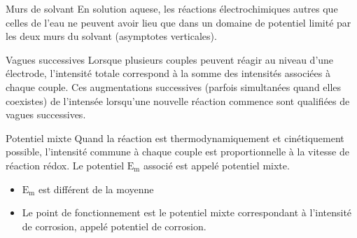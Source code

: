 \documentclass[french, a4paper, 11pt, twocolumn]{article}
\begin{document}
    \begin{cadre}{Murs de solvant}
        En solution aquese, les réactions électrochimiques autres que celles de l'eau ne peuvent avoir lieu que dans un
        domaine de potentiel limité par les deux murs du solvant (asymptotes verticales).
    \end{cadre}

    \begin{cadre}{Vagues successives}
        Lorsque plusieurs couples peuvent réagir au niveau d'une électrode, l'intensité totale correspond à la somme des 
        intensités associées à chaque couple. Ces augmentations successives (parfois simultanées quand elles coexistes)
        de l'intensée lorsqu'une nouvelle réaction commence sont qualifiées de vagues successives.
    \end{cadre}

    \begin{cadre}{Potentiel mixte}
        Quand la réaction est thermodynamiquement et cinétiquement possible,
        l'intensité commune à chaque couple est proportionnelle à la vitesse de 
        réaction rédox. Le potentiel \(\mathrm{E_m}\) associé est appelé potentiel mixte.
        

        \tcblower
        \begin{itemize}
            \item \(\mathrm{E_m}\) est différent de la moyenne
            \item Le point de fonctionnement est le potentiel mixte correspondant à l'intensité de corrosion,
                appelé potentiel de corrosion.
        \end{itemize}
        
    \end{cadre}
\end{document}
